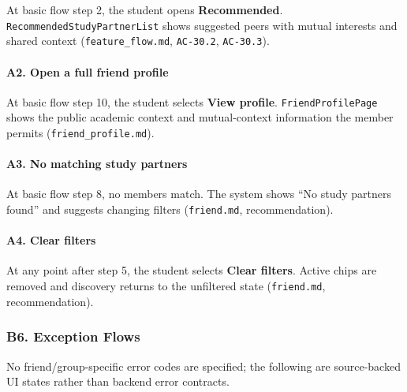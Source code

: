 \documentclass[12pt]{article}
\begin{document}
At basic flow step 2, the student opens \textbf{Recommended}. \texttt{RecommendedStudyPartnerList} shows suggested peers with mutual interests and shared context (\texttt{feature\_flow.md}, \texttt{AC-30.2}, \texttt{AC-30.3}).
\par\medskip

\hypertarget{sec:a2-open-a-full-friend-profile}{}
\paragraph*{A2. Open a full friend profile}
\par\medskip

At basic flow step 10, the student selects \textbf{View profile}. \texttt{FriendProfilePage} shows the public academic context and mutual-context information the member permits (\texttt{friend\_profile.md}).
\par\medskip

\hypertarget{sec:a3-no-matching-study-partners}{}
\paragraph*{A3. No matching study partners}
\par\medskip

At basic flow step 8, no members match. The system shows “No study partners found” and suggests changing filters (\texttt{friend.md}, recommendation).
\par\medskip

\hypertarget{sec:a4-clear-filters}{}
\paragraph*{A4. Clear filters}
\par\medskip

At any point after step 5, the student selects \textbf{Clear filters}. Active chips are removed and discovery returns to the unfiltered state (\texttt{friend.md}, recommendation).
\par\medskip

\hypertarget{sec:b6-exception-flows}{}
\subsubsection*{B6. Exception Flows}
\par\medskip

No friend/group-specific error codes are specified; the following are source-backed UI states rather than backend error contracts.
\par\medskip
\end{document}

